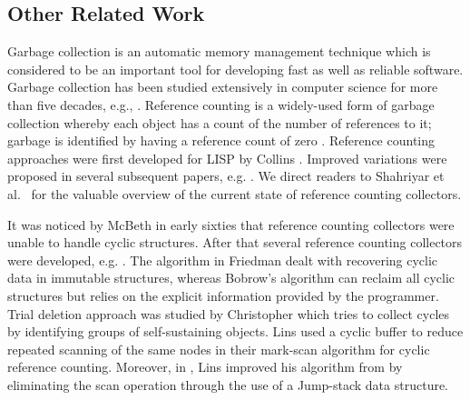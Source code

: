 \subsection{Other Related Work}
\label{subsection:otherrelated}
Garbage collection is
an automatic memory management technique which is considered to be an important tool for developing fast as well as reliable software.  Garbage collection has been studied extensively in computer science for more than five decades, e.g., \cite{McBeth1963,Brownbridge1985,Salkild1987,Pepels1988,Bacon2001,Bacon:2001:JWC,Barabash2005,Jones1996}. %
Reference counting is a widely-used form of garbage collection whereby each object has a count of the number of references to it; garbage is identified by having a reference count of zero \cite{Bacon2001}.
Reference counting approaches were first developed for LISP by Collins \cite{Collins1960}.
Improved variations were proposed in several subsequent papers, e.g. \cite{Friedman1979,Hughes1987,Jones1996,Lins2008,Levanoni2006}. We direct readers to Shahriyar et al.~\cite{Shahriyar:2012} for the valuable overview of the current state of reference counting collectors.

It was noticed by McBeth \cite{McBeth1963} in early sixties that reference counting collectors were unable to handle cyclic structures.
After that several reference counting collectors were developed, e.g. \cite{Friedman1979,Bobrow1980,Lins:1992:CRC,Lins:2002:EAC}.
The algorithm in Friedman \cite{Friedman1979} dealt with recovering cyclic data in immutable structures, whereas Bobrow's algorithm \cite{Bobrow1980}
can reclaim all cyclic structures but relies on the explicit
information provided by the programmer. 
Trial deletion approach was studied by Christopher \cite{Christopher1984} which tries to collect cycles by identifying groups of self-sustaining objects. 
Lins \cite{Lins:1992:CRC} used a cyclic buffer to reduce repeated scanning of the same nodes in their mark-scan algorithm for cyclic reference counting. Moreover, in \cite{Lins:2002:EAC}, Lins improved his algorithm  from \cite{Lins:1992:CRC} by eliminating the scan operation through the use of a Jump-stack data structure.


